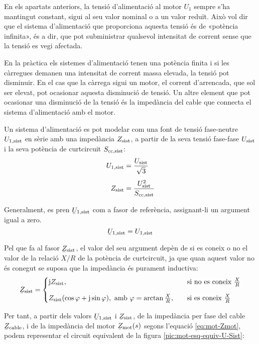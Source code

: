 En els apartats anteriors, la tensió d'alimentació al motor $U_1$ sempre s'ha mantingut constant, sigui al seu valor nominal o a un valor reduït. Això vol dir que el sistema d'alimentació que proporciona aquesta tensió és de «potència infinita», és a dir, que pot subministrar qualsevol intensitat de corrent sense que la tensió es vegi afectada.

En la pràctica els sistemes d'alimentació tenen una potència finita i si les càrregues demanen una intensitat de corrent massa elevada, la tensió pot disminuir. En el cas que la càrrega sigui un motor, el corrent d'arrencada, que sol ser elevat, pot ocasionar aquesta disminució de tensió. Un altre element que pot ocasionar una disminució de la tensió és la impedància del cable que connecta el sistema d'alimentació amb el motor.

Un sistema d'alimentació es pot modelar com una font de tensió fase-neutre $U_\mathrm{1,sist}$ en sèrie amb una impedància $Z_\mathrm{sist}$, a partir de la seva tensió fase-fase $U_\mathrm{sist}$ i la seva potència de curtcircuit $S_\mathrm{cc,sist}$:
\begin{align}
	U_\mathrm{1,sist} &= \frac{U_\mathrm{sist}}{\sqrt{3}} \\[1ex]
	Z_\mathrm{sist} &= \frac{U_\mathrm{sist}^2}{S_\mathrm{cc,sist}}
\end{align}

Generalment, es pren $\cmplx{U}\ped{1,sist}$ com a fasor de referència, assignant-li un argument igual a zero. 
\begin{equation}
	\cmplx{U}\ped{1,sist} = U\ped{1,sist}
\end{equation}

Pel que fa al fasor  $\cmplx{Z}\ped{sist}$, el valor del seu argument depèn de si es coneix o no el valor de la relació $X/R$ de la potència de curtcircuit, ja que quan aquest valor no és conegut se suposa que la impedància és purament inductiva:
\begin{equation}
	\cmplx{Z}\ped{sist} = 
	\begin{cases}
		\ju Z\ped{sist},  & \quad\text{si no es coneix }\frac{X}{R}  \\[2ex]
		Z\ped{sist} (\cos\varphi+\ju\sin\varphi), \text{ amb } \varphi=\arctan\frac{X}{R}, & \quad\text{si es coneix } \frac{X}{R} 
	\end{cases}
\end{equation}

Per tant, a partir dels valors $\cmplx{U}\ped{1,sist}$ i $\cmplx{Z}\ped{sist}$, de la impedància per fase del cable $\cmplx{Z}\ped{cable}$, i de la impedància del motor $\cmplx{Z}\ped{mot}(s)$ segons l'equació \eqref{eq:mot-Zmot}, podem representar el circuit equivalent de la figura \vref{pic:mot-esq-equiv-U-Sist}:
\begin{center}
	
	\label{pic:mot-esq-equiv-U-Sist}
\end{center}

